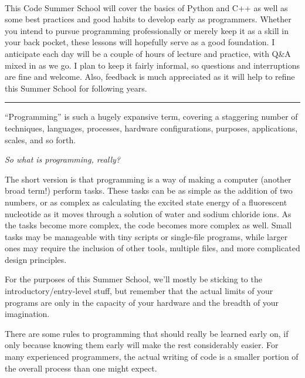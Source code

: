\paragraph{}This Code Summer School will cover the basics of Python and C++ as well as some best practices and good habits to develop early as programmers.  Whether you intend to pursue programming professionally or merely keep it as a skill in your back pocket, these lessons will hopefully serve as a good foundation.  I anticipate each day will be a couple of hours of lecture and practice, with Q\&A mixed in as we go.  I plan to keep it fairly informal, so questions and interruptions are fine and welcome.  Also, feedback is much appreciated as it will help to refine this Summer School for following years.

\begin{center}\rule{0.5\linewidth}{0.5pt}\end{center}

``Programming'' is such a hugely expansive term,
covering a staggering number of techniques, languages, processes,
hardware configurations, purposes, applications, scales, and so forth.

\emph{So what is programming, really?}

The short version is that programming is a way of making a computer
(another broad term!) perform tasks. These tasks can be as simple as the
addition of two numbers, or as complex as calculating the excited state
energy of a fluorescent nucleotide as it moves through a solution of
water and sodium chloride ions. As the tasks become more complex, the
code becomes more complex as well. Small tasks may be manageable with
tiny scripts or single-file programs, while larger ones may require the
inclusion of other tools, multiple files, and more complicated design
principles.

For the purposes of this Summer School, we'll mostly be sticking to the
introductory/entry-level stuff, but remember that the actual limits of
your programs are only in the capacity of your hardware and the breadth
of your imagination.

There are some rules to programming that should really be learned early
on, if only because knowing them early will make the rest considerably
easier. For many experienced programmers, the actual writing of code is
a smaller portion of the overall process than one might expect.




